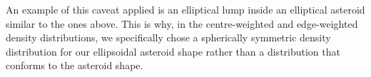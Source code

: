 \documentclass[fleqn,usenatbib]{mnras}
\begin{document}
An example of this caveat applied is an elliptical lump inside an elliptical asteroid similar to the ones above. This is why, in the centre-weighted and edge-weighted density distributions, we specifically chose a spherically symmetric density distribution for our ellipsoidal asteroid shape rather than a distribution that conforms to the asteroid shape.


\end{document}

